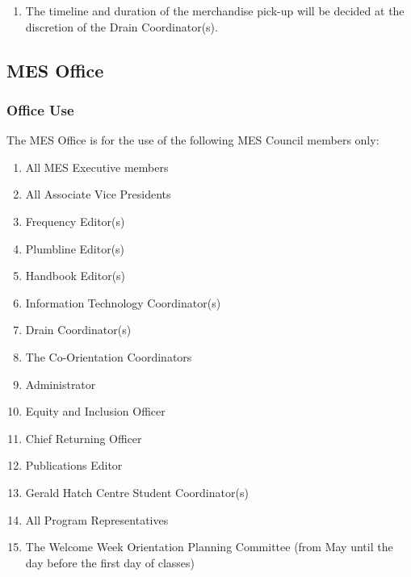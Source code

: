 \begin{enumerate}
  \begin{enumerate}
   \item
   The timeline and duration of the merchandise pick-up will be decided at the discretion of the Drain Coordinator(s).
  \end{enumerate}
\end{enumerate}

\subsection{MES Office}
\label{mes-office}

\subsubsection{Office Use}
\label{office-use}

The MES Office is for the use of the following MES Council members only:

\begin{enumerate}
 \item
  All MES Executive members
 \item
  All Associate Vice Presidents
 \item
  Frequency Editor(s)
 \item
  Plumbline Editor(s)
 \item
  Handbook Editor(s)
 \item
  Information Technology Coordinator(s)
 \item
  Drain Coordinator(s)
 \item
  The Co-Orientation Coordinators
  \item 
  Administrator
 \item
  Equity and Inclusion Officer
 \item
  Chief Returning Officer
 \item
  Publications Editor
 \item
  Gerald Hatch Centre Student Coordinator(s)
 \item
  All Program Representatives
 \item
 The Welcome Week Orientation Planning Committee (from May until the day before the first day of classes)
\end{enumerate}

